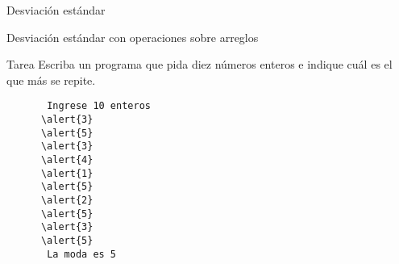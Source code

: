 \documentclass[10pt]{beamer}
\begin{document}
  \begin{frame}{Desviación estándar}
    
  \end{frame}

  \begin{frame}{Desviación estándar con operaciones sobre arreglos}
    
  \end{frame}

  \begin{frame}[fragile]{Tarea}
    Escriba un programa que pida diez números enteros
    e indique cuál es el que más se repite.

    \begin{Verbatim}
       Ingrese 10 enteros
      \alert{3}
      \alert{5}
      \alert{3}
      \alert{4}
      \alert{1}
      \alert{5}
      \alert{2}
      \alert{5}
      \alert{3}
      \alert{5}
       La moda es 5
    \end{Verbatim}

\end{frame}
\end{document}
